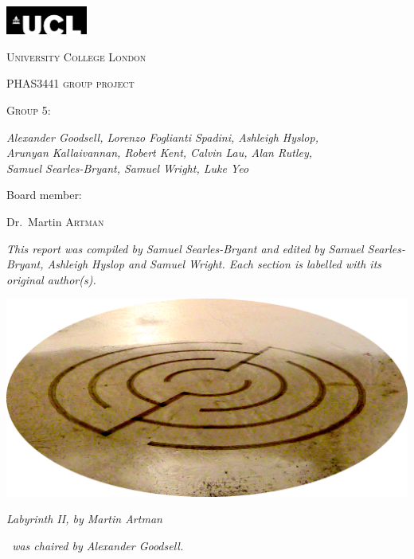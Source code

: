 \pagestyle{plain}

\begin{titlepage}
    \centering
    \includegraphics[width=0.2\textwidth]{Files/UCL}\par\vspace{1cm}
    {\scshape\LARGE University College London \par}
    \vspace{1cm}
    {\scshape PHAS3441 group project\par}
    {\scshape Group 5:~\teamname\par}
    \vspace{1.5cm}
    {\huge\bfseries {} \projectTitle\par}
    \vspace{2cm}
    {\Large\itshape Alexander Goodsell, Lorenzo Foglianti Spadini, Ashleigh Hyslop,\\ Arunyan Kallaivannan, Robert Kent, Calvin Lau, Alan Rutley,\\ Samuel Searles-Bryant, Samuel Wright, Luke Yeo\par}
    \vfill
    Board member:\par
    Dr.~Martin \textsc{Artman}%

    \vfill

    {\large \thedate\par}
\end{titlepage}

{\centering
{\itshape This report was compiled by Samuel Searles-Bryant and edited by Samuel Searles-Bryant, Ashleigh Hyslop and Samuel Wright. Each section is labelled with its original author(s).\par}
\vfill
\includegraphics[width=\textwidth]{Files/labyrinth_II_ellipse}\par
{\itshape \emph{Labyrinth II}, by Martin Artman\par}
\vfill
{\itshape \teamname~was chaired by Alexander Goodsell.\par}
}
